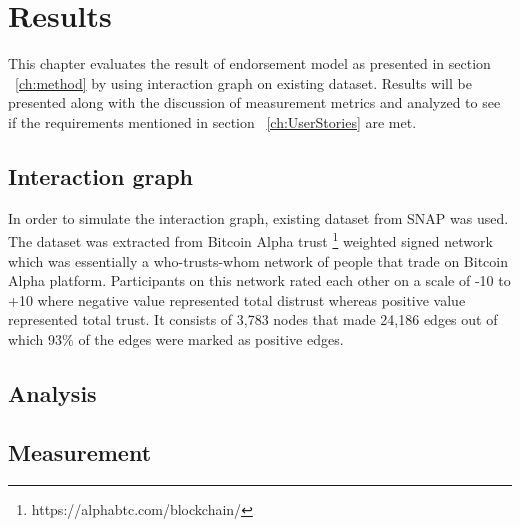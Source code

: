\chapter{Results} \label{ch:results}
This chapter evaluates the result of endorsement model as presented in section
~\ref{ch:method} by using interaction graph on existing dataset. Results will
be presented along with the discussion of measurement metrics and analyzed to
see if the requirements mentioned in section ~\ref{ch:UserStories} are met.  

\section{Interaction graph}
In order to simulate the interaction graph, existing dataset from SNAP
\cite{snapnets} was used. The dataset was extracted from Bitcoin Alpha trust
\footnote{https://alphabtc.com/blockchain/}
weighted signed network which was essentially a who-trusts-whom network of
people that trade on Bitcoin Alpha platform. Participants on this network rated
each other on a scale of -10 to +10 where negative value represented total
distrust whereas positive value represented total trust. It consists of 3,783
nodes that made 24,186 edges out of which 93\% of the edges were marked as
positive edges\cite{kumar2016edge}. 







\section{Analysis}
\section{Measurement}
